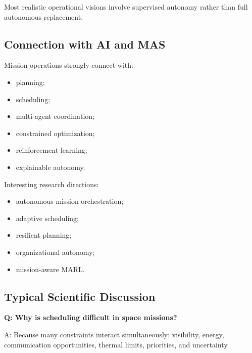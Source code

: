 \documentclass[10pt,a4paper,twocolumn]{article}
\begin{document}
\begin{keybox}
    Most realistic operational visions involve supervised autonomy rather than full autonomous replacement.
\end{keybox}


\subsection{Connection with AI and MAS}

Mission operations strongly connect with:
\begin{itemize}
    \item planning;
    \item scheduling;
    \item multi-agent coordination;
    \item constrained optimization;
    \item reinforcement learning;
    \item explainable autonomy.
\end{itemize}

Interesting research directions:
\begin{itemize}
    \item autonomous mission orchestration;
    \item adaptive scheduling;
    \item resilient planning;
    \item organizational autonomy;
    \item mission-aware MARL.
\end{itemize}


\subsection{Typical Scientific Discussion}

\begin{questionbox}
    \textbf{Q: Why is scheduling difficult in space missions?}

    A: Because many constraints interact simultaneously: visibility, energy, communication opportunities, thermal limits, priorities, and uncertainty.
\end{questionbox}
\end{document}
